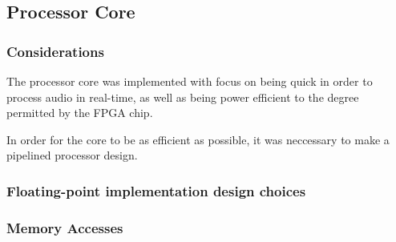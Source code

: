 \FloatBarrier
\subsection{Processor Core}\label{section:fpga-processor-core}

\subsubsection{Considerations}

The processor core was implemented with focus on being quick
in order to process audio in real-time, as well as being power
efficient to the degree permitted by the FPGA chip.

In order for the core to be as efficient as possible, it was
neccessary to make a pipelined processor design.

\subsubsection{Floating-point implementation design choices}

\subsubsection{Memory Accesses}
